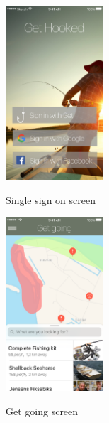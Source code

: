 \begin{figure}[t!]
  \hspace{3.5cm}
  \begin{subfigure}[t]{0.2\textwidth}
  	  \includegraphics[width=0.4\textwidth]{images/Introscreen.png}
  	  \label{fig:f1}
  	  \caption{Single sign on screen}
  \end{subfigure}
  \hfill
  \begin{subfigure}[t]{0.2\textwidth}
  	  \includegraphics[width=0.4\textwidth]{images/Map.png}
  	  \label{fig:f2}
   	  \caption{Get going screen}
  \end{subfigure}
  \hfill
  \begin{subfigure}[t]{0.2\textwidth}

\end{subfigure}
\end{figure}
